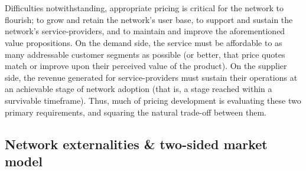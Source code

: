 \documentclass[longbibliography,nofootinbib]{revtex4-1}
\begin{document}
\\\\
Difficulties notwithstanding, appropriate pricing is critical for the network to flourish; to grow and retain the network’s user base, to support and sustain the network’s service-providers, and to maintain and improve the aforementioned value propositions. On the demand side, the service must be affordable to as many addressable customer segments as possible (or better, that price quotes match or improve upon their perceived value of the product). On the supplier side, the revenue generated for service-providers must sustain their operations at an achievable stage of network adoption (that is, a stage reached within a survivable timeframe). Thus, much of pricing development is evaluating these two primary requirements, and squaring the natural trade-off between them.

\subsection{Network externalities \& two-sided market model}
\end{document}
